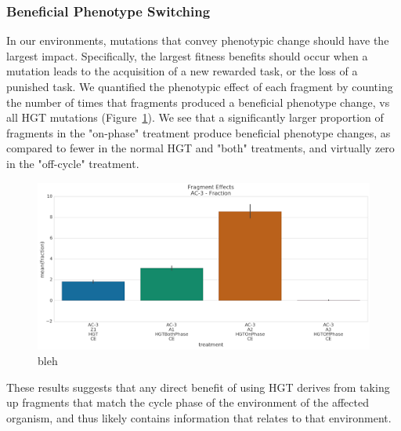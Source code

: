 \documentclass[PhD]{msu-thesis}
\begin{document}
\subsubsection{Beneficial Phenotype Switching}
In our environments, mutations that convey phenotypic change should have the largest impact. Specifically, the largest fitness benefits should occur when a mutation leads to the acquisition of a new rewarded task, or the loss of a punished task.  
We quantified 
the phenotypic effect of each fragment by counting the number of times that fragments produced a beneficial phenotype change, vs all HGT mutations (Figure~\ref{fig:beneficial_fraction_by_cycle_phase_source}). We see that a significantly larger proportion of fragments in the "on-phase" treatment produce beneficial phenotype changes, as compared to fewer in the normal HGT and "both" treatments, and virtually zero in the "off-cycle" treatment. 

\begin{figure}[h!]
\begin{center}
\includegraphics[width=0.7\columnwidth]{figures/HGT/beneficial_fraction_by_cycle_phase_source.png}
\caption{bleh%
}\label{fig:beneficial_fraction_by_cycle_phase_source}
\end{center}
\end{figure}

These results suggests that any direct benefit of using HGT derives from taking up fragments that match the cycle phase of the environment of the affected organism, and thus likely contains information that relates to that environment. %
\end{document}
